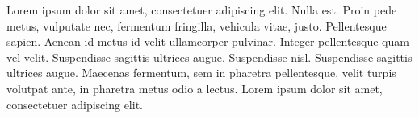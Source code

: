 Lorem ipsum dolor sit amet, consectetuer adipiscing elit. Nulla est. Proin pede metus, vulputate nec, fermentum fringilla, vehicula vitae, justo. Pellentesque sapien. Aenean id metus id velit ullamcorper pulvinar. Integer pellentesque quam vel velit. Suspendisse sagittis ultrices augue. Suspendisse nisl. Suspendisse sagittis ultrices augue. Maecenas fermentum, sem in pharetra pellentesque, velit turpis volutpat ante, in pharetra metus odio a lectus. Lorem ipsum dolor sit amet, consectetuer adipiscing elit.
